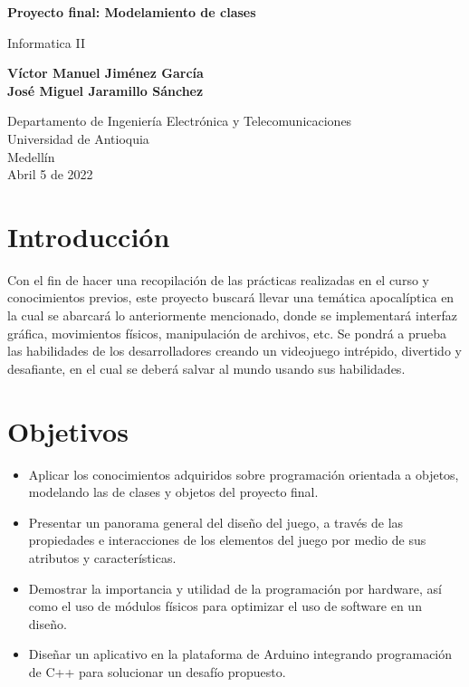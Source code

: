 \documentclass{article}
\begin{document}
\begin{titlepage}
    \begin{center}
        \vspace*{1cm}
            
        \Huge
        \textbf{Proyecto final: Modelamiento de clases}
            
        \vspace{0.5cm}
        \LARGE
        Informatica II
            
        \vspace{1.5cm}
            
        \textbf{Víctor Manuel Jiménez García\\
                José Miguel Jaramillo Sánchez}

        \vfill
            
        \vspace{0.8cm}
            
        \Large
        Departamento de Ingeniería Electrónica y Telecomunicaciones\\
        Universidad de Antioquia\\
        Medellín\\
        Abril 5 de 2022
    \end{center}
\end{titlepage}

\tableofcontents

\newpage
\section{Introducción}
Con el fin de hacer una recopilación de las prácticas realizadas en el curso y conocimientos previos, este proyecto buscará llevar una temática apocalíptica en la cual se abarcará lo anteriormente mencionado, donde se implementará interfaz gráfica, movimientos físicos, manipulación de archivos, etc. Se pondrá a prueba las habilidades de los desarrolladores creando un videojuego intrépido, divertido y desafiante, en el cual se deberá salvar al mundo usando sus habilidades.
\section{Objetivos}\label{objetivos}
\begin{itemize}
    \item Aplicar los conocimientos adquiridos sobre programación orientada a objetos, modelando las de clases y objetos del proyecto final.
    \item Presentar un panorama general del diseño del juego, a través de las propiedades e interacciones de los elementos del juego por medio de sus atributos y características.
    \item Demostrar la importancia y utilidad de la programación por hardware, así como el uso de módulos físicos para optimizar el uso de software en un diseño.
    \item Diseñar un aplicativo en la plataforma de Arduino integrando programación de C++ para solucionar un desafío  propuesto.
\end{itemize}
\end{document}
